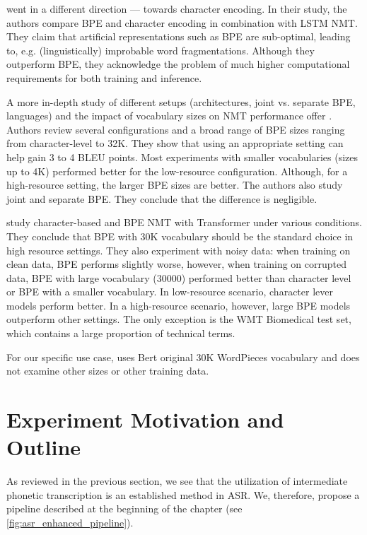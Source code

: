  went in a different direction --- towards character encoding. In their study, the authors compare BPE and character encoding in combination with LSTM NMT. They claim that artificial representations such as BPE are sub-optimal, leading to, e.g. (linguistically) improbable word fragmentations. Although they outperform BPE, they acknowledge the problem of much higher computational requirements for both training and inference.

A more in-depth study of different setups (architectures, joint vs. separate BPE, languages) and the impact of vocabulary sizes on NMT performance offer . Authors review several configurations and a broad range of BPE sizes ranging from character-level to 32K. They show that using an appropriate setting can help gain 3 to 4 BLEU points. Most experiments with smaller vocabularies (sizes up to 4K) performed better for the low-resource configuration. Although, for a high-resource setting, the larger BPE sizes are better. The authors also study joint and separate BPE. They conclude that the difference is negligible.


 study character-based and BPE NMT with Transformer under various conditions. They conclude that BPE with 30K vocabulary should be the standard choice in high resource settings. They also experiment with noisy data: when training on clean data, BPE performs slightly worse, however, when training on corrupted data, BPE with large vocabulary (30000) performed better than character level or BPE with a smaller vocabulary. In low-resource scenario, character lever models perform better. In a high-resource scenario, however, large BPE models outperform other settings. The only exception is the WMT Biomedical test set, which contains a large proportion of technical terms.

For our specific use case,  uses Bert  original 30K WordPieces vocabulary and does not examine other sizes or other training data.

\pagebreak
\section{Experiment Motivation and Outline}
\label{easr:eperiment}
As reviewed in the previous section, we see that the utilization of intermediate phonetic transcription is an established method in ASR. We, therefore, propose a pipeline described at the beginning of the chapter (see \cref{fig:asr_enhanced_pipeline}). 

